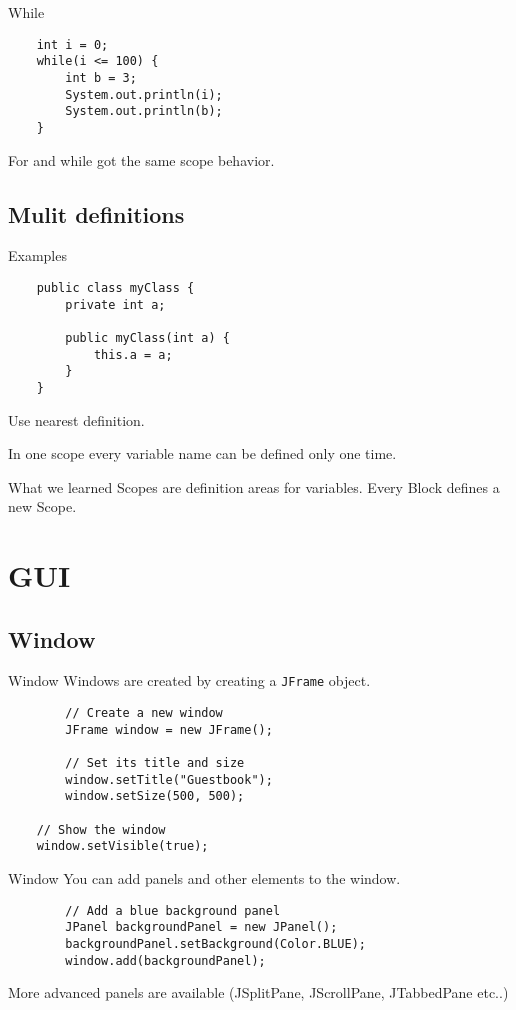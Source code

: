 \begin{frame}[fragile]{While}
	\begin{lstlisting}
	int i = 0;
	while(i <= 100) {
		int b = 3;
		System.out.println(i);
		System.out.println(b);
	}
	\end{lstlisting}
	
	For and while got the same scope behavior.
\end{frame}
  
\subsection{Mulit definitions}
\begin{frame}[fragile]{Examples}
	\begin{lstlisting}
	public class myClass {
		private int a;
	
		public myClass(int a) {
			this.a = a;
		}
	}
	\end{lstlisting}

	Use nearest definition.

	In one scope every variable name can be defined only one time.
\end{frame}

\begin{frame}{What we learned}
	Scopes are definition areas for variables.
	Every Block defines a new Scope.
\end{frame}
    
\section{GUI}
\subsection{Window}
\begin{frame}[fragile]{Window}
  Windows are created by creating a \texttt{JFrame} object.
	\begin{lstlisting}
		// Create a new window
		JFrame window = new JFrame();

		// Set its title and size
		window.setTitle("Guestbook");
		window.setSize(500, 500);
    
    // Show the window
    window.setVisible(true);
	\end{lstlisting}
\end{frame}

\begin{frame}[fragile]{Window}
  You can add panels and other elements to the window.
	\begin{lstlisting}
		// Add a blue background panel
		JPanel backgroundPanel = new JPanel();
		backgroundPanel.setBackground(Color.BLUE);
		window.add(backgroundPanel);
	\end{lstlisting}

  More advanced panels are available (JSplitPane, JScrollPane, JTabbedPane etc..)
\end{frame}

